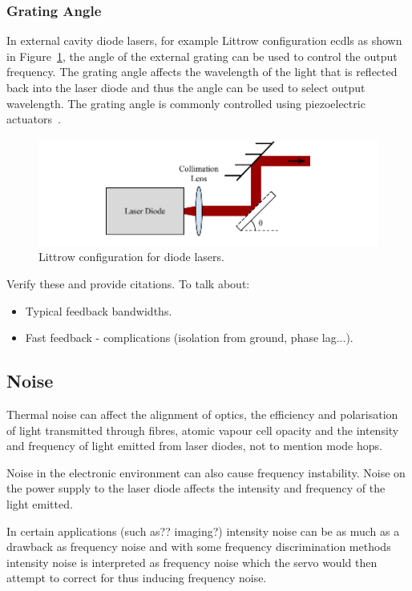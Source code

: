 \subsubsection{Grating Angle}
In external cavity diode lasers, for example Littrow configuration \glspl{ecdl} as shown in Figure~\ref{figure:littrow}, the angle of the external grating can be used to control the output frequency.
The grating angle affects the wavelength of the light that is reflected back into the laser diode and thus the angle can be used to select output wavelength.
The grating angle is commonly controlled using piezoelectric actuators~\cite{hawthorn_littrow_2001}.

\begin{figure}
\includegraphics{part1/Figs/LittrowConfiguration.pdf}
\caption{Littrow configuration for diode lasers.}
\label{figure:littrow}
\end{figure}

{\color{red} Verify these and provide citations.}
To talk about:
\begin{itemize}
\item Typical feedback bandwidths.
\item Fast feedback - complications (isolation from ground, phase lag...).
\end{itemize}


\subsection{Noise}
Thermal noise can affect the alignment of optics, the efficiency and polarisation of light transmitted through fibres, atomic vapour cell opacity and the intensity and frequency of light emitted from laser diodes, not to mention mode hops.

Noise in the electronic environment can also cause frequency instability. Noise on the power supply to the laser diode affects the intensity and frequency of the light emitted.

In certain applications {\color{red}(such as?? imaging?)} intensity noise can be as much as a drawback as frequency noise and with some frequency discrimination methods intensity noise is interpreted as frequency noise which the servo would then attempt to correct for thus inducing frequency noise.

